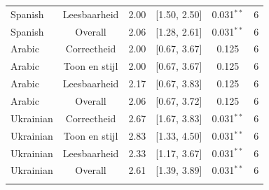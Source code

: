 \begin{table}[htbp]
\begin{tabular}{@{}l c c c c c@{}}
Spanish & Leesbaarheid & 2.00 & [1.50, 2.50] & 0.031$^{**}$ & 6 \\
Spanish & Overall & 2.06 & [1.28, 2.61] & 0.031$^{**}$ & 6 \\
\addlinespace[2pt]
Arabic & Correctheid & 2.00 & [0.67, 3.67] & 0.125 & 6 \\
Arabic & Toon en stijl & 2.00 & [0.67, 3.67] & 0.125 & 6 \\
Arabic & Leesbaarheid & 2.17 & [0.67, 3.83] & 0.125 & 6 \\
Arabic & Overall & 2.06 & [0.67, 3.72] & 0.125 & 6 \\
\addlinespace[2pt]
Ukrainian & Correctheid & 2.67 & [1.67, 3.83] & 0.031$^{**}$ & 6 \\
Ukrainian & Toon en stijl & 2.83 & [1.33, 4.50] & 0.031$^{**}$ & 6 \\
Ukrainian & Leesbaarheid & 2.33 & [1.17, 3.67] & 0.031$^{**}$ & 6 \\
Ukrainian & Overall & 2.61 & [1.39, 3.89] & 0.031$^{**}$ & 6 \\
\addlinespace[2pt]
\bottomrule
\end{tabular}
\end{table}

